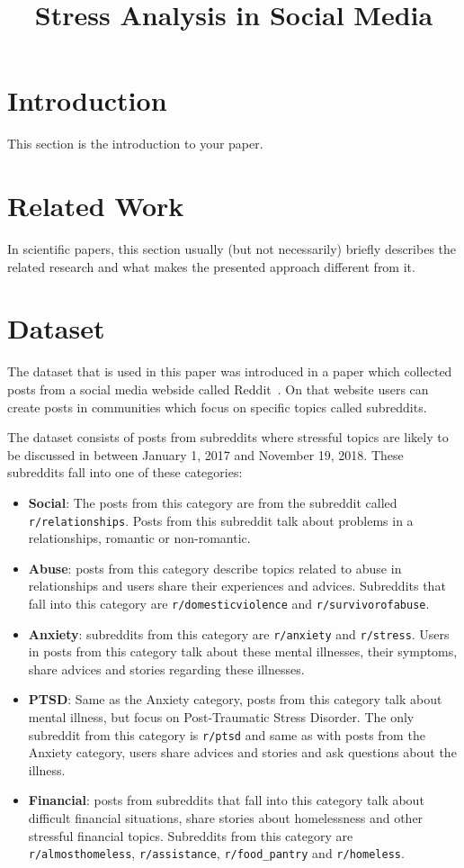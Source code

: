 \documentclass[10pt, a4paper]{article}
\title{Stress Analysis in Social Media}
\begin{document}
\maketitleabstract

\section{Introduction}

This section is the introduction to your paper.

\section{Related Work}

In scientific papers, this section usually (but not necessarily) briefly describes the related research and what makes the presented approach different from it.

\section{Dataset}

The dataset that is used in this paper was introduced in a paper which collected posts from a social media webside called Reddit~\citep{dreaddit}.
On that website users can create posts in communities which focus on specific topics called subreddits.

The dataset consists of posts from subreddits where stressful topics are likely to be discussed in between January 1, 2017 and November 19, 2018.
These subreddits fall into one of these categories:

\begin{itemize}
    \item \textbf{Social}: The posts from this category are from the subreddit called \verb|r/relationships|.
        Posts from this subreddit talk about problems in a relationships, romantic or non-romantic.
    \item \textbf{Abuse}: posts from this category describe topics related to abuse in relationships and users share their experiences and advices.
        Subreddits that fall into this category are \verb|r/domesticviolence| and \verb|r/survivorofabuse|.
    \item \textbf{Anxiety}: subreddits from this category are \verb|r/anxiety| and \verb|r/stress|.
        Users in posts from this category talk about these mental illnesses, their symptoms, share advices and stories regarding these illnesses.
    \item \textbf{PTSD}: Same as the Anxiety category, posts from this category talk about mental illness, but focus on Post-Traumatic Stress Disorder.
        The only subreddit from this category is \verb|r/ptsd| and same as with posts from the Anxiety category, users share advices and stories and ask questions about the illness.
    \item \textbf{Financial}: posts from subreddits that fall into this category talk about difficult financial situations, share stories about homelessness and other stressful financial topics.
        Subreddits from this category are \verb|r/almosthomeless|, \verb|r/assistance|, \verb|r/food_pantry| and \verb|r/homeless|.
\end{itemize}
\end{document}
